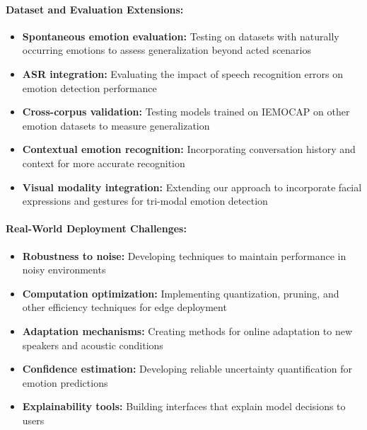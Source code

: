 \documentclass[12pt]{article}
\begin{document}
\paragraph{Dataset and Evaluation Extensions:}
\begin{itemize}
    \item \textbf{Spontaneous emotion evaluation:} Testing on datasets with naturally occurring emotions to assess generalization beyond acted scenarios
    
    \item \textbf{ASR integration:} Evaluating the impact of speech recognition errors on emotion detection performance
    
    \item \textbf{Cross-corpus validation:} Testing models trained on IEMOCAP on other emotion datasets to measure generalization
    
    \item \textbf{Contextual emotion recognition:} Incorporating conversation history and context for more accurate recognition
    
    \item \textbf{Visual modality integration:} Extending our approach to incorporate facial expressions and gestures for tri-modal emotion detection
\end{itemize}

\paragraph{Real-World Deployment Challenges:}
\begin{itemize}
    \item \textbf{Robustness to noise:} Developing techniques to maintain performance in noisy environments
    
    \item \textbf{Computation optimization:} Implementing quantization, pruning, and other efficiency techniques for edge deployment
    
    \item \textbf{Adaptation mechanisms:} Creating methods for online adaptation to new speakers and acoustic conditions
    
    \item \textbf{Confidence estimation:} Developing reliable uncertainty quantification for emotion predictions
    
    \item \textbf{Explainability tools:} Building interfaces that explain model decisions to users
\end{itemize}
\end{document}
